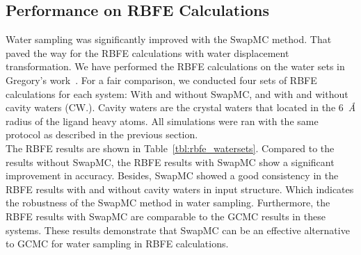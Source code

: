 \documentclass[journal=jacsat,manuscript=article]{achemso}
\begin{document}
\subsection{Performance on RBFE Calculations}
Water sampling was significantly improved with the SwapMC method.
That paved the way for the RBFE calculations with water displacement transformation.
We have performed the RBFE calculations on the water sets in Gregory's work~\cite{ross2020enhancing}.
For a fair comparison, we conducted four sets of RBFE calculations for each system:
With and without SwapMC, and with and without cavity waters (CW.).
Cavity waters are the crystal waters that located in the 6~\textit{Å} radius of the ligand heavy atoms.
All simulations were ran with the same protocol as described in the previous section.\\ 
\newline
The RBFE results are shown in Table~\ref{tbl:rbfe_watersets}.
Compared to the results without SwapMC, the RBFE results with SwapMC show a significant improvement in accuracy.
Besides, SwapMC showed a good consistency in the RBFE results with and without cavity waters in input structure.
Which indicates the robustness of the SwapMC method in water sampling.
Furthermore, the RBFE results with SwapMC are comparable to the GCMC results in these systems.
These results demonstrate that SwapMC can be an effective alternative to GCMC for water sampling in RBFE calculations.
\end{document}
